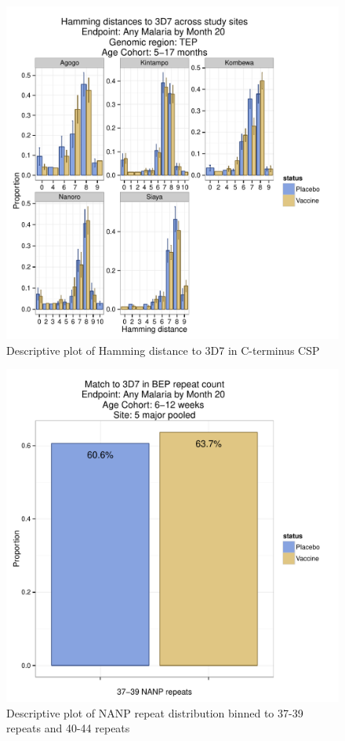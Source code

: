 \documentclass[]{article}
\begin{document}
\begin{figure}[htbp]
\centering
\includegraphics{figures/hamming-infant-sites-x-1.pdf}
\caption{Descriptive plot of Hamming distance to 3D7 in C-terminus CSP}
\end{figure}

\begin{figure}[htbp]
\centering
\includegraphics{figures/bep-cat-newborn-x-1.pdf}
\caption{Descriptive plot of NANP repeat distribution binned to 37-39
repeats and 40-44 repeats}
\end{figure}
\end{document}
